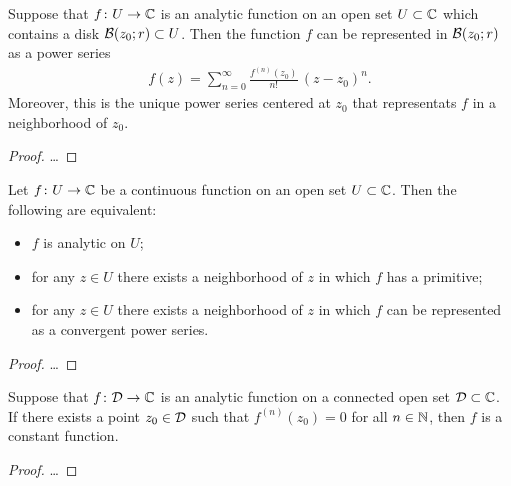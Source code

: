 \begin{theorem}
  \label{thm:analytic_function_taylor_series}
  Suppose that $f \colon U \to \bC$ is an analytic function
  on an open set $U \subset \bC$ which contains
  a disk $\DiskRC{r}{z_0} \subset U$.
  Then the function $f$ can be represented in $\DiskRC{r}{z_0}$
  as a power series
  \begin{align*}
    f(z) = \sum_{n=0}^\infty \frac{f^{(n)}(z_0)}{n!} \, (z-z_0)^n .
  \end{align*}
  Moreover, this is the unique power series centered at $z_0$
  that representats $f$ in a neighborhood of $z_0$.
\end{theorem}
\begin{proof}
  \ldots
\end{proof}

\begin{theorem}
  \label{thm:TFAE_ANALYTIC}
  Let $f \colon U \to \bC$ be a continuous function on an open
  set $U \subset \bC$.
  Then the following are equivalent:
  \begin{itemize}
    \item $f$ is analytic on $U$;
    \item for any $z \in U$ there exists a neighborhood of $z$
      in which $f$ has a primitive;
    \item for any $z \in U$ there exists a neighborhood of $z$
      in which $f$ can be represented as a convergent power series.
  \end{itemize}
\end{theorem}
\begin{proof}
  \ldots
\end{proof}

\begin{lemma}
  \label{lem:no_vanishing_of_all_order_derivatives}
  Suppose that $f \colon \Domain \to \bC$ is an analytic function
  on a connected open set $\Domain \subset \bC$.
  If there exists a point $z_0 \in \Domain$
  such that $f^{(n)}(z_0) = 0$ for all $n \in \bN$, then $f$ is a constant
  function.
\end{lemma}
\begin{proof}
  \ldots
\end{proof}

